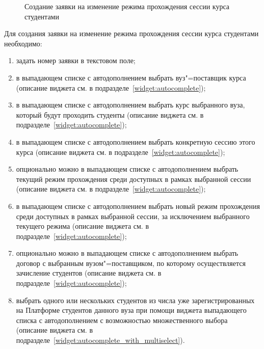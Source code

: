 \begin{figure}[H]
	\caption{Создание заявки на изменение режима прохождения сессии курса студентами}
	\label{img:student:change_mode_req_create}
\end{figure}

Для создания заявки на изменение режима прохождения сессии курса студентами необходимо:
\begin{enumerate}
	\item задать номер заявки в текстовом поле;
	\item в выпадающем списке с автодополнением выбрать вуз"=поставщик курса
	(описание виджета см. в подразделе~\ref{widget:autocomplete});
	\item в выпадающем списке с автодополнением выбрать курс выбранного вуза, который будут проходить студенты 
	(описание виджета см. в подразделе~\ref{widget:autocomplete});
	\item в выпадающем списке с автодополнением выбрать конкретную сессию этого курса 
	(описание виджета см. в подразделе~\ref{widget:autocomplete});
	\item опционально можно в выпадающем списке с автодополнением выбрать текущий режим прохождения среди 
	доступных в рамках выбранной сессии (описание виджета см. в подразделе~\ref{widget:autocomplete});
	\item в выпадающем списке с автодополнением выбрать новый режим прохождения среди доступных в рамках выбранной 
	сессии, за исключением выбранного текущего режима (описание виджета см. в подразделе~\ref{widget:autocomplete});
	\item опционально можно в выпадающем списке с автодополнением выбрать договор с выбранным вузом"=поставщиком, 
	по которому осуществляется зачисление студентов (описание виджета см. в подразделе~\ref{widget:autocomplete});
	\item выбрать одного или нескольких студентов из числа уже зарегистрированных на Платформе студентов данного вуза 
	при помощи виджета выпадающего списка с автодополнением с возможностью множественного выбора 
	(описание виджета см. в подразделе~\ref{widget:autocomplete_with_multiselect}). 
\end{enumerate}



